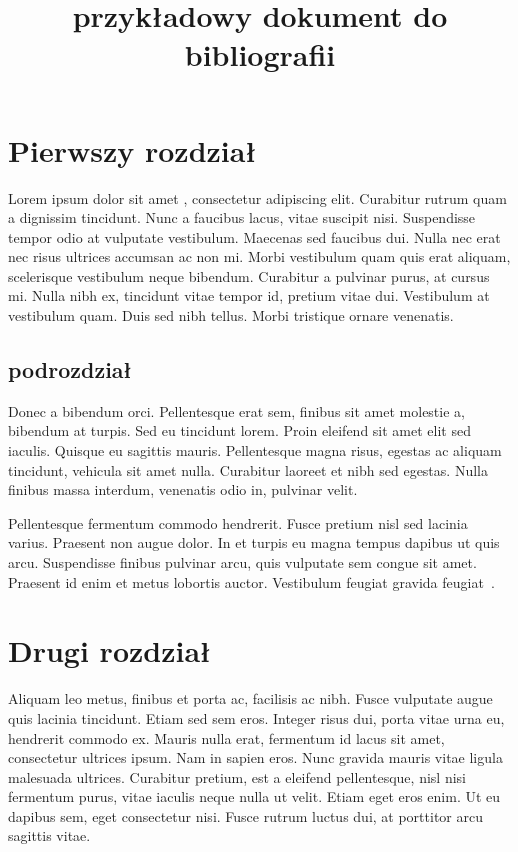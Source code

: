\documentclass{article}
\author{}
\date{}
\title{przykładowy dokument do bibliografii}
\begin{document}
	    
\maketitle

\tableofcontents

\section{Pierwszy rozdział}
Lorem ipsum dolor sit amet \cite{abbott2009ligo}, consectetur adipiscing elit. Curabitur rutrum quam a dignissim tincidunt. Nunc a faucibus lacus, vitae suscipit nisi. Suspendisse tempor odio at vulputate vestibulum. Maecenas sed faucibus dui. Nulla nec erat nec risus ultrices accumsan ac non mi. Morbi vestibulum quam quis erat aliquam, scelerisque vestibulum neque bibendum. Curabitur a pulvinar purus, at cursus mi. Nulla nibh ex, tincidunt vitae tempor id, pretium vitae dui. Vestibulum at vestibulum quam. Duis sed nibh tellus. Morbi tristique ornare venenatis. \cite{cieslik2022revisiting}
\subsection{podrozdział}
Donec a bibendum orci. Pellentesque erat sem, finibus sit amet molestie a, bibendum at turpis. Sed eu tincidunt lorem. Proin eleifend sit amet elit sed iaculis. Quisque eu sagittis mauris. Pellentesque magna risus, egestas ac aliquam tincidunt, vehicula sit amet nulla. Curabitur laoreet et nibh sed egestas. Nulla finibus massa interdum, venenatis odio in, pulvinar velit.

Pellentesque fermentum commodo hendrerit. Fusce pretium nisl sed lacinia varius. Praesent non augue dolor. In et turpis eu magna tempus dapibus ut quis arcu. Suspendisse finibus pulvinar arcu, quis vulputate sem congue sit amet. Praesent id enim et metus lobortis auctor. Vestibulum feugiat gravida feugiat~\cite{cieslik2022revisiting}.

\section{Drugi rozdział}
Aliquam leo metus, finibus et porta ac, facilisis ac nibh. Fusce vulputate augue quis lacinia tincidunt. Etiam sed sem eros. Integer risus dui, porta vitae urna eu, hendrerit commodo ex. Mauris nulla erat, fermentum id lacus sit amet, consectetur ultrices ipsum. Nam in sapien eros. Nunc gravida mauris vitae ligula malesuada ultrices. Curabitur pretium, est a eleifend pellentesque, nisl nisi fermentum purus, vitae iaculis neque nulla ut velit. Etiam eget eros enim. Ut eu dapibus sem, eget consectetur nisi. Fusce rutrum luctus dui, at porttitor arcu sagittis vitae.
\end{document}
